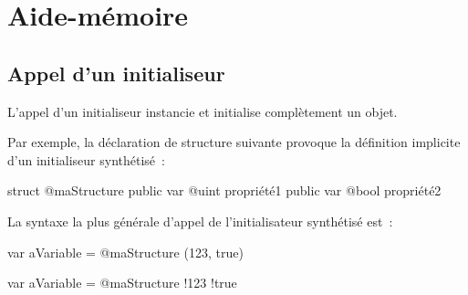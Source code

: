 
\chapter{Aide-mémoire}


\section{Appel d'un initialiseur}

L'appel d'un initialiseur instancie et initialise complètement un objet.

Par exemple, la déclaration de structure suivante provoque la définition implicite d'un initialiseur synthétisé~:
\begin{galgas34}
struct @maStructure {
  public var @uint propriété1
  public var @bool propriété2
}
\end{galgas34}

La syntaxe la plus générale d'appel de l'initialisateur synthétisé est~:

\begin{galgas34}
var aVariable = @maStructure (123, true)
\end{galgas34}
\begin{galgas3}
var aVariable = @maStructure {!123 !true}
\end{galgas3}


